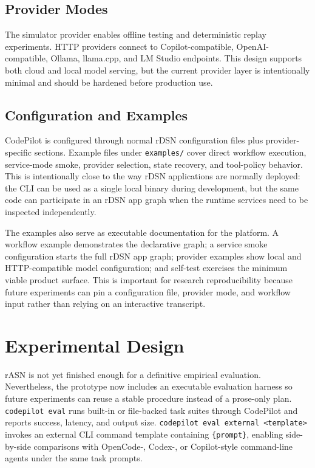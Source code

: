 \documentclass[manuscript,screen,review]{acmart}
\newcommand{\rasn}{rASN\xspace}
\newcommand{\rdsn}{rDSN\xspace}
\newcommand{\codepilot}{CodePilot\xspace}
\begin{document}
\subsection{Provider Modes}

The simulator provider enables offline testing and deterministic replay
experiments. HTTP providers connect to Copilot-compatible, OpenAI-compatible,
Ollama, llama.cpp, and LM Studio endpoints. This design supports both cloud and
local model serving, but the current provider layer is intentionally minimal
and should be hardened before production use.

\subsection{Configuration and Examples}

\codepilot is configured through normal \rdsn configuration files plus
provider-specific sections. Example files under \texttt{examples/} cover direct
workflow execution, service-mode smoke, provider selection, state recovery, and
tool-policy behavior. This is intentionally close to the way rDSN applications
are normally deployed: the CLI can be used as a single local binary during
development, but the same code can participate in an rDSN app graph when the
runtime services need to be inspected independently.

The examples also serve as executable documentation for the platform. A workflow
example demonstrates the declarative graph; a service smoke configuration starts
the full rDSN app graph; provider examples show local and HTTP-compatible model
configuration; and self-test exercises the minimum viable product surface. This
is important for research reproducibility because future experiments can pin a
configuration file, provider mode, and workflow input rather than relying on an
interactive transcript.

\section{Experimental Design}
\label{sec:experimental-design}

\rasn is not yet finished enough for a definitive empirical evaluation.
Nevertheless, the prototype now includes an executable evaluation harness so
future experiments can reuse a stable procedure instead of a prose-only plan.
\texttt{codepilot eval} runs built-in or file-backed task suites through
\codepilot and reports success, latency, and output size. \texttt{codepilot eval
external <template>} invokes an external CLI command template containing
\texttt{\{prompt\}}, enabling side-by-side comparisons with OpenCode-, Codex-,
or Copilot-style command-line agents under the same task prompts.
\end{document}

